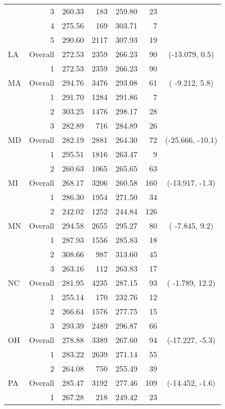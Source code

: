 \begin{longtable}{lrrr@{\extracolsep{.25cm}}rrc}
   & 3 & 260.33 & 183 & 259.80 &  23 &  \\ 
   & 4 & 275.56 & 169 & 303.71 &   7 &  \\ 
   & 5 & 290.60 & 2117 & 307.93 &  19 &  \\ 
   \hline
LA & Overall & 272.53 & 2359 & 266.23 &  90 & (-13.079,   0.5) \\ 
   & 1 & 272.53 & 2359 & 266.23 &  90 &  \\ 
   \hline
MA & Overall & 294.76 & 3476 & 293.08 &  61 & ( -9.212,   5.8) \\ 
   & 1 & 291.70 & 1284 & 291.86 &   7 &  \\ 
   & 2 & 303.25 & 1476 & 298.17 &  28 &  \\ 
   & 3 & 282.89 & 716 & 284.89 &  26 &  \\ 
   \hline
MD & Overall & 282.19 & 2881 & 264.30 &  72 & (-25.666, -10.1) \\ 
   & 1 & 295.51 & 1816 & 263.47 &   9 &  \\ 
   & 2 & 260.63 & 1065 & 265.65 &  63 &  \\ 
   \hline
MI & Overall & 268.17 & 3206 & 260.58 & 160 & (-13.917,  -1.3) \\ 
   & 1 & 286.30 & 1954 & 271.50 &  34 &  \\ 
   & 2 & 242.02 & 1252 & 244.84 & 126 &  \\ 
   \hline
MN & Overall & 294.58 & 2655 & 295.27 &  80 & ( -7.845,   9.2) \\ 
   & 1 & 287.93 & 1556 & 285.83 &  18 &  \\ 
   & 2 & 308.66 & 987 & 313.60 &  45 &  \\ 
   & 3 & 263.16 & 112 & 263.83 &  17 &  \\ 
   \hline
NC & Overall & 281.95 & 4235 & 287.15 &  93 & ( -1.789,  12.2) \\ 
   & 1 & 255.14 & 170 & 232.76 &  12 &  \\ 
   & 2 & 266.64 & 1576 & 277.75 &  15 &  \\ 
   & 3 & 293.39 & 2489 & 296.87 &  66 &  \\ 
   \hline
OH & Overall & 278.88 & 3389 & 267.60 &  94 & (-17.227,  -5.3) \\ 
   & 1 & 283.22 & 2639 & 271.14 &  55 &  \\ 
   & 2 & 264.08 & 750 & 255.49 &  39 &  \\ 
   \hline
PA & Overall & 285.47 & 3192 & 277.46 & 109 & (-14.452,  -1.6) \\ 
   & 1 & 267.28 & 218 & 249.42 &  23 &  \\ 

\end{longtable}
